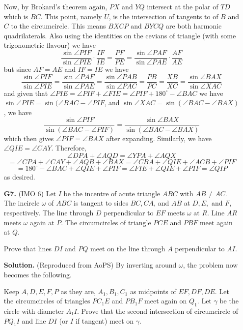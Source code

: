 \documentclass[11pt,a4paper]{article}
\begin{document}
\begin{enumerate}
	Now, by Brokard's theorem again, $PX$ and $YQ$ intersect at the polar of $TD$ which is $BC$. This point, namely $U$, is the intersection of tangents to of $B$ and $C$ to the circumcircle. This means $BXCP$ and $BYCQ$ are both harmonic quadrilaterals. Also using the identities on the cevians of triangle (with some trigonometric flavour) we have
	$$
	\frac{\sin\angle PIF}{\sin\angle PIE}\cdot \frac{IF}{IE} = \frac{PF}{PE} = \frac{\sin\angle PAF}{\sin\angle PAE}\cdot \frac{AF}{AE}
	$$but since $AF=AE$ and $IF=IE$ we have
	$$\frac{\sin\angle PIF}{\sin\angle PIE}=\frac{\sin\angle PAF}{\sin\angle PAE}=\frac{\sin\angle PAB}{\sin\angle PAC}= \frac{PB}{PC} = \frac{XB}{XC} = \frac{\sin\angle BAX}{\sin\angle XAC}$$and given that $\angle PIE = \angle PIF + \angle FIE = \angle PIF + 180^{\circ} - \angle BAC$ we have $\sin\angle PIE = \sin(\angle BAC - \angle PIF$, and $\sin \angle XAC = \sin(\angle BAC - \angle BAX)$, we have
	$$
	\frac{\sin\angle PIF}{ \sin(\angle BAC - \angle PIF)} = \frac{\sin\angle BAX}{\sin(\angle BAC - \angle BAX)}
	$$which then gives $\angle PIF = \angle BAX$ after expanding. Similarly, we have $\angle QIE = \angle CAY$. Therefore,
	$$
	\angle DPA + \angle AQD 
	=\angle YPA + \angle AQX
	$$
	$$
	=\angle CPA + \angle CAY + \angle AQB + \angle BAX
	=\angle CBA + \angle QIE + \angle ACB + \angle PIF 
	$$
	$$
	=180^{\circ} - \angle BAC+ \angle QIE + \angle PIF 
	=\angle FIE + \angle QIE + \angle PIF 
	=\angle QIP
	$$as desired.
	
	
	\item [\textbf{G7.}] (IMO 6) Let $I$ be the incentre of acute triangle $ABC$ with $AB\neq AC$. The incircle $\omega$ of $ABC$ is tangent to sides $BC, CA$, and $AB$ at $D, E,$ and $F$, respectively. The line through $D$ perpendicular to $EF$ meets $\omega$ at $R$. Line $AR$ meets $\omega$ again at $P$. The circumcircles of triangle $PCE$ and $PBF$ meet again at $Q$.
	
	Prove that lines $DI$ and $PQ$ meet on the line through $A$ perpendicular to $AI$.
	
	\textbf{Solution.} (Reproduced from AoPS) 
	By inverting around $\omega$, the problem now becomes the following. 
	
	Keep $A, D, E, F, P$ as they are, $A_1, B_1, C_1$ as midpoints of $EF, DF, DE$. Let the circumcircles of triangles $PC_1E$ and $PB_1F$ meet again on $Q_1$. Let $\gamma$ be the circle with diameter $A_1I$. Prove that the second intersection of circumcircle of $PQ_1I$ and line $DI$ (or $I$ if tangent) meet on $\gamma$. 
	

\end{enumerate}
\end{document}
